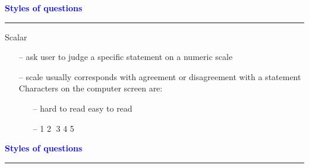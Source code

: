 \documentclass[pdf]{beamer}
\begin{document}
{{{{{{%
{
\begin{frame}
	\vspace{8mm}
	\textcolor{Blue}{\textbf{\large{Styles of questions}}}
    \textcolor{red}{\rule{10cm}{1mm}}
    
    Scalar
    \begin{itemize}
      \item[\textcolor{black}{--}] ask user to judge a specific statement on a numeric scale
      \item[\textcolor{black}{--}] scale usually corresponds with agreement or disagreement with a statement
      \vspace{10mm}\\
      \hspace{5mm}Characters on the computer screen are:
      \begin{itemize}     \item[\textcolor{black}{--}] hard to read \hspace{15mm} easy to read
      \item[\textcolor{black}{--}] {\hspace{10mm} 1\hspace{3mm} \textcircled{2}\hspace{3mm} 3\hspace{3mm} 4\hspace{3mm} 5}
      \end{itemize}
      \vspace{25mm}
    \end{itemize}    
\end{frame}



{
\begin{frame}
	\vspace{8mm}
	\textcolor{Blue}{\textbf{\large{Styles of questions}}}
    \textcolor{red}{\rule{10cm}{1mm}}
    

\end{frame}}}}}}}}}
\end{document}
